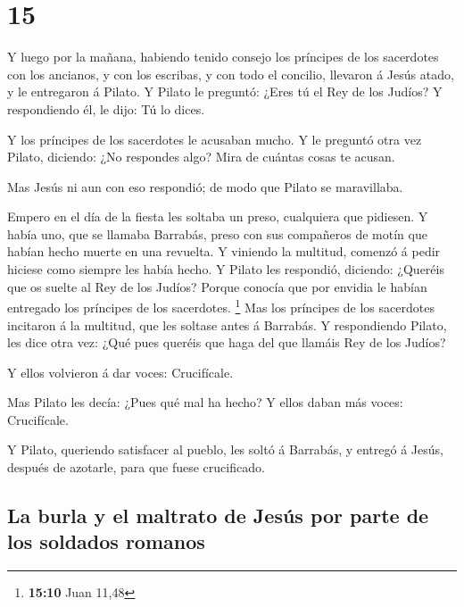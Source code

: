 \hypertarget{section-14}{%
\section{15}\label{section-14}}

 Y luego por la mañana, habiendo tenido consejo los
príncipes de los sacerdotes con los ancianos, y con los escribas, y con
todo el concilio, llevaron á Jesús atado, y le entregaron á Pilato.
 Y Pilato le preguntó: ¿Eres tú el Rey de los Judíos? Y
respondiendo él, le dijo: Tú lo dices.

 Y los príncipes de los sacerdotes le acusaban mucho.
 Y le preguntó otra vez Pilato, diciendo: ¿No respondes
algo? Mira de cuántas cosas te acusan.

 Mas Jesús ni aun con eso respondió; de modo que Pilato se
maravillaba.

 Empero en el día de la fiesta les soltaba un preso,
cualquiera que pidiesen.  Y había uno, que se llamaba
Barrabás, preso con sus compañeros de motín que habían hecho muerte en
una revuelta.  Y viniendo la multitud, comenzó á pedir
hiciese como siempre les había hecho.  Y Pilato les
respondió, diciendo: ¿Queréis que os suelte al Rey de los Judíos?
 Porque conocía que por envidia le habían entregado los
príncipes de los sacerdotes. \footnote{\textbf{15:10} Juan 11,48}
 Mas los príncipes de los sacerdotes incitaron á la
multitud, que les soltase antes á Barrabás.  Y respondiendo
Pilato, les dice otra vez: ¿Qué pues queréis que haga del que llamáis
Rey de los Judíos?

 Y ellos volvieron á dar voces: Crucifícale.

 Mas Pilato les decía: ¿Pues qué mal ha hecho? Y ellos
daban más voces: Crucifícale.

 Y Pilato, queriendo satisfacer al pueblo, les soltó á
Barrabás, y entregó á Jesús, después de azotarle, para que fuese
crucificado.

\hypertarget{la-burla-y-el-maltrato-de-jesuxfas-por-parte-de-los-soldados-romanos}{%
\subsection{La burla y el maltrato de Jesús por parte de los soldados
romanos}\label{la-burla-y-el-maltrato-de-jesuxfas-por-parte-de-los-soldados-romanos}}

